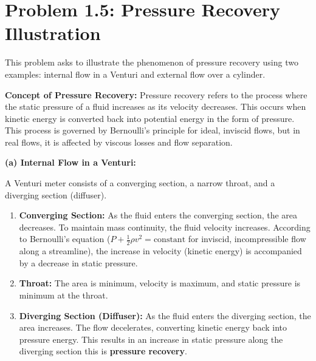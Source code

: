 \hypertarget{problem-1.5-pressure-recovery-illustration}{%
\section{Problem 1.5: Pressure Recovery
Illustration}\label{problem-1.5-pressure-recovery-illustration}}

This problem asks to illustrate the phenomenon of pressure recovery
using two examples: internal flow in a Venturi and external flow over a
cylinder.

\textbf{Concept of Pressure Recovery:} Pressure recovery refers to the
process where the static pressure of a fluid increases as its velocity
decreases. This occurs when kinetic energy is converted back into
potential energy in the form of pressure. This process is governed by
Bernoulli's principle for ideal, inviscid flows, but in real flows, it
is affected by viscous losses and flow separation.

\textbf{(a) Internal Flow in a Venturi:}

A Venturi meter consists of a converging section, a narrow throat, and a
diverging section (diffuser).

\begin{enumerate}
\def\labelenumi{\arabic{enumi}.}
\tightlist
\item
  \textbf{Converging Section:} As the fluid enters the converging
  section, the area decreases. To maintain mass continuity, the fluid
  velocity increases. According to Bernoulli's equation
  (\(P + \frac{1}{2} \rho v^2 = \text{constant}\) for inviscid,
  incompressible flow along a streamline), the increase in velocity
  (kinetic energy) is accompanied by a decrease in static pressure.
\item
  \textbf{Throat:} The area is minimum, velocity is maximum, and static
  pressure is minimum at the throat.
\item
  \textbf{Diverging Section (Diffuser):} As the fluid enters the
  diverging section, the area increases. The flow decelerates,
  converting kinetic energy back into pressure energy. This results in
  an increase in static pressure along the diverging section this is
  \textbf{pressure recovery}.
\end{enumerate}

